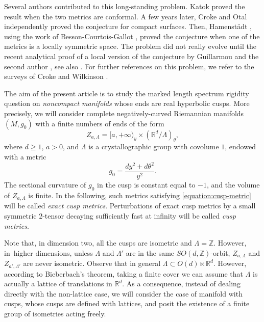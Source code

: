 \documentclass[10pt]{amsart}
\newcommand{\R}{\mathbb{R}}
\newcommand{\Z}{\mathbb{Z}}
\theoremstyle{plain}
\theoremstyle{definition}
\begin{document}
Several authors contributed to this long-standing problem. Katok \cite{Katok-88} proved the result when the two metrics are conformal. A few years later, Croke \cite{Croke-90} and Otal \cite{Otal-90} independently proved the conjecture for compact surfaces. Then, Hamenstädt \cite{Hamenstadt-99}, using the work of Besson-Courtois-Gallot \cite{Besson-Courtois-Gallot-95}, proved the conjecture when one of the metrics is a locally symmetric space. The problem did not really evolve until the recent analytical proof of a local version of the conjecture by Guillarmou and the second author \cite{Guillarmou-Lefeuvre-18}, see also \cite{Guillarmou-Knieper-Lefeuvre-22}. For further references on this problem, we refer to the surveys of Croke \cite{Croke-04} and Wilkinson \cite{Wilkinson-14}.

The aim of the present article is to study the marked length spectrum rigidity question on \emph{noncompact manifolds} whose ends are real hyperbolic cusps. More precisely, we will consider complete negatively-curved Riemannian manifolds $(M,g_0)$ with a finite numbers of ends of the form
\begin{equation}
\label{equation:cusp-top}
Z_{a,\Lambda} = [a,+\infty)_y \times (\R^d/\Lambda)_\theta,
\end{equation}
where $d \geq 1$, $a>0$, and $\Lambda$ is a crystallographic group with covolume $1$, endowed with a metric
\begin{equation}
\label{equation:cusp-metric}
g_0 = \frac{dy^2 + d\theta^2}{y^2}.
\end{equation}
The sectional curvature of $g_0$ in the cusp is constant equal to $-1$, and the volume of $Z_{a,\Lambda}$ is finite. In the following, such metrics satisfying \eqref{equation:cusp-metric} will be called \emph{exact cusp metrics}. Perturbations of exact cusp metrics by a small symmetric $2$-tensor decaying sufficiently fast at infinity will be called \emph{cusp metrics}.

Note that, in dimension two, all the cusps are isometric and $\Lambda = \Z$. However, in~higher dimensions, unless $\Lambda$ and $\Lambda'$ are in the same $SO(d,\Z)$-orbit, $Z_{a,\Lambda}$ and $Z_{a',\Lambda'}$ are never isometric. Observe that in general $\Lambda \subset O(d)\ltimes \R^d$. However, according to Bieberbach's theorem, taking a finite cover we can assume that $\Lambda$ is actually a lattice of translations in $\R^d$. As a consequence, instead of dealing directly with the non-lattice case, we will consider the case of manifold with cusps, whose cusps are defined with lattices, and posit the existence of a finite group of isometries acting freely.
\end{document}
